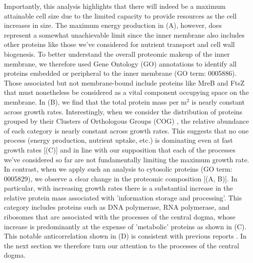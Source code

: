 Importantly, this analysis highlights that there will indeed be a maximum
attainable cell size due to the limited capacity to provide resources as the
cell increases in size. The maximum energy production in
(A), however, does represent a somewhat unachievable limit
since the inner membrane also includes other proteins like those we've
considered for nutrient transport and cell wall biogenesis. To better understand
the overall proteomic makeup of the inner membrane, we therefore used Gene
Ontology (GO) annotations \citep{ashburner2000, thegeneOntologyconsortium2018}
to identify all proteins embedded or peripheral to the inner membrane (GO term:
0005886). Those associated but not membrane-bound include proteins like MreB and
FtsZ that must nonetheless be considered as a vital component occupying space on
the membrane. In (B), we find that the total protein mass
per \textmu m$^2$ is nearly constant across growth rates. Interestingly, when we
consider the distribution of proteins grouped by their Clusters of Orthologous
Groups (COG) \citep{tatusov2000}, the relative abundance of each category is
nearly constant across growth rates. This suggests that no one process (energy
production, nutrient uptake, etc.) is dominating even at fast growth rates
[(C)] and in line with our supposition that each of the
processes we've considered so far are not fundamentally limiting the maximum
growth rate. In contrast, when we apply such an analysis to cytosolic proteins
(GO term: 0005829), we observe a clear change in the proteomic composition
[(A, B)]. In particular, with increasing growth rates there is
a substantial increase in the relative protein mass associated with 'information
storage and processing'. This category includes proteins such as DNA polymerase,
RNA polymerase, and ribosomes that are associated with the processes of the
central dogma, whose increase is predominantly at the expense of 'metabolic'
proteins as shown in (C). This notable anticorrelation shown in
(D) is consistent with  previous reports \citep{scott2010,
hui2015, zhu2019}. In the next section we therefore turn our attention to the
processes of the central dogma.

